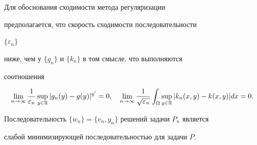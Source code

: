  


Для обоснования сходимости метода регуляризации 


предполагается, что скорость сходимости последовательности 


$\{\varepsilon_n\}$ 


ниже, чем у $\{g_n\}$ и $\{k_n\}$ в том смысле, что выполняются 


соотношения 


\begin{equation} 


\lim_{n\to\infty}\frac{1}{\varepsilon_n}\sup_{y\in\Bbb R} 


|g_n(y)-g(y)|^{q'}=0,\quad \lim_{n\to\infty} 


\frac{1}{\sqrt{\varepsilon_n}}\int_\Omega \sup_{y\in\Bbb R} 


|k_n(x,y)-k(x,y)|dx=0. 


\end{equation} 


 


\begin{thm} 


Последовательность $\{w_n\}=\{v_n,y_n\}$ решений задачи $P_n$ является 


слабой минимизирующей последовательностью для задачи $P$. 


\end{thm} 


 


